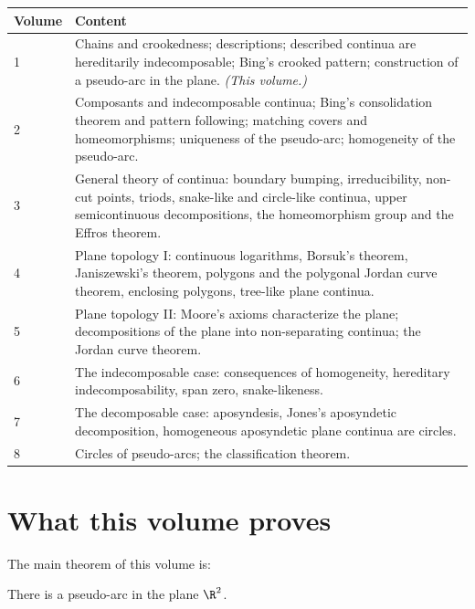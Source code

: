 \begin{center}
\begin{tabular}{@{}lp{}@{}}
\toprule
Volume & Content\\
\midrule
1 & Chains and crookedness; descriptions; described continua are hereditarily
indecomposable; Bing's crooked pattern; construction of a pseudo-arc in the plane.
\emph{(This volume.)}\\
2 & Composants and indecomposable continua; Bing's consolidation theorem and pattern
following; matching covers and homeomorphisms; uniqueness of the pseudo-arc; homogeneity
of the pseudo-arc.\\
3 & General theory of continua: boundary bumping, irreducibility, non-cut points, triods,
snake-like and circle-like continua, upper semicontinuous decompositions, the
homeomorphism group and the Effros theorem.\\
4 & Plane topology I: continuous logarithms, Borsuk's theorem, Janiszewski's theorem,
polygons and the polygonal Jordan curve theorem, enclosing polygons, tree-like plane
continua.\\
5 & Plane topology II: Moore's axioms characterize the plane; decompositions of the plane
into non-separating continua; the Jordan curve theorem.\\
6 & The indecomposable case: consequences of homogeneity, hereditary indecomposability,
span zero, snake-likeness.\\
7 & The decomposable case: aposyndesis, Jones's aposyndetic decomposition, homogeneous
aposyndetic plane continua are circles.\\
8 & Circles of pseudo-arcs; the classification theorem.\\
\bottomrule
\end{tabular}
\end{center}

\section{What this volume proves}

The main theorem of this volume is:

\begin{theorem}\label{thm:main-vol1}
There is a pseudo-arc in the plane $\R^2$.
\end{theorem}

